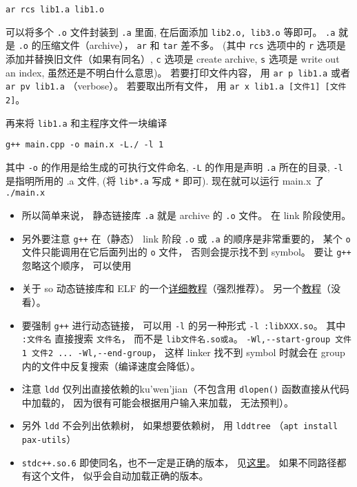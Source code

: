 \begin{lstlisting}[language=none]
ar rcs lib1.a lib1.o
\end{lstlisting}
可以将多个 \verb`.o` 文件封装到 \verb`.a` 里面, 在后面添加 \verb`lib2.o, lib3.o` 等即可。 \verb`.a` 就是 \verb`.o` 的压缩文件（archive）， \verb`ar` 和 \verb`tar` 差不多。 (其中 \verb`rcs` 选项中的 \verb`r` 选项是添加并替换旧文件（如果有同名）, \verb`c` 选项是 create archive, \verb`s` 选项是 write out an index, 虽然还是不明白什么意思)。 若要打印文件内容， 用 \verb`ar p lib1.a` 或者 \verb`ar pv lib1.a` （verbose）。 若要取出所有文件， 用 \verb`ar x lib1.a [文件1] [文件2]`。

再来将 \verb`lib1.a` 和主程序文件一块编译
\begin{lstlisting}[language=none]
g++ main.cpp -o main.x -L./ -l 1
\end{lstlisting}

其中 \verb`-o` 的作用是给生成的可执行文件命名, \verb`-L` 的作用是声明 \verb`.a` 所在的目录, \verb`-l` 是指明所用的 .a 文件, (将 \verb`lib*.a` 写成 \verb`*` 即可).
现在就可以运行 main.x 了
\verb`./main.x`

\begin{itemize}
\item 所以简单来说， 静态链接库 \verb`.a` 就是 archive 的 \verb`.o` 文件。 在 link 阶段使用。
\item 另外要注意 \verb`g++` 在（静态） link 阶段 \verb`.o` 或 \verb`.a` 的顺序是非常重要的， 某个 \verb`o` 文件只能调用在它后面列出的 \verb`o` 文件， 否则会提示找不到 symbol。 要让 \verb`g++` 忽略这个顺序， 可以使用
\item 关于 so 动态链接库和 ELF 的一个\href{https://amir.rachum.com/blog/2016/09/17/shared-libraries/}{详细教程}（强烈推荐）。 另一个\href{https://holtstrom.com/michael/blog/post/446/Shared-Library-Symbol-Conflicts-(on-Solaris).html}{教程}（没看）。
\item 要强制 \verb`g++` 进行动态链接， 可以用 \verb`-l` 的另一种形式 \verb`-l :libXXX.so`。 其中 \verb`:文件名` 直接搜索 \verb`文件名`， 而不是 \verb`lib文件名.so或a`。
\verb`-Wl,--start-group 文件1 文件2 ... -Wl,--end-group`， 这样 linker 找不到 symbol 时就会在 group 内的文件中反复搜索（编译速度会降低）。
\item 注意 \verb`ldd` 仅列出直接依赖的ku'wen'jian（不包含用 \verb`dlopen()` 函数直接从代码中加载的， 因为很有可能会根据用户输入来加载， 无法预判）。
\item 另外 \verb`ldd` 不会列出依赖树， 如果想要依赖树， 用 \verb`lddtree` （\verb`apt install pax-utils`）
\item \verb`stdc++.so.6` 即使同名，也不一定是正确的版本， 见\href{https://unix.stackexchange.com/questions/458659/what-do-the-multiple-glibc-versions-mean-in-the-output-of-ldd}{这里}。 如果不同路径都有这个文件， 似乎会自动加载正确的版本。
\end{itemize}

